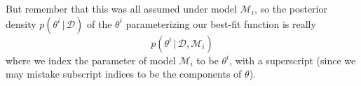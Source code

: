   But remember that this was all assumed under model $\mathcal{M}_i$, so the posterior density $p(\theta^i \,|\,\mathcal{D})$ of the $\theta^i$ parameterizing our best-fit function is really
  \begin{equation}
    p(\theta^i \,|\,\mathcal{D}, \mathcal{M}_i)
  \end{equation}
  where we index the parameter of model $\mathcal{M}_i$ to be $\theta^i$, with a superscript (since we may mistake subscript indices to be the components of $\theta$).

